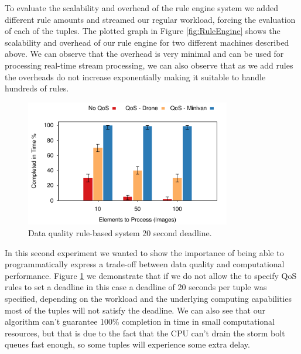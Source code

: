 To evaluate the scalability and overhead of the rule engine system we added different rule amounts and streamed our regular workload, forcing the evaluation of each of the tuples. The plotted graph in Figure  \ref{fig:RuleEngine} shows the scalability and overhead of our rule engine for two different machines described above. We can observe that the overhead is very minimal and can be used for processing real-time stream processing, we can also observe that as we add rules the overheads do not increase exponentially making it suitable to handle hundreds of rules.

\begin{figure}[h!]
  \includegraphics[width=0.8\textwidth]{Results/QoS}
  \caption{Data quality rule-based system 20 second deadline.}
  \label{fig:QoS}
  \vspace{-2ex}
\end{figure}

In this second experiment we wanted to show the importance of being able to programmatically express a trade-off between data quality and computational performance. Figure \ref{fig:QoS} we demonstrate that if we do not allow the to specify QoS rules to set a deadline in this case a deadline of 20 seconds per tuple was specified, depending on the workload and the underlying computing capabilities most of the tuples will not satisfy the deadline. We can also see that our algorithm can't guarantee 100\% completion in time in small computational resources, but that is due to the fact that the CPU can't drain the storm bolt queues fast enough, so some tuples will experience some extra delay.

